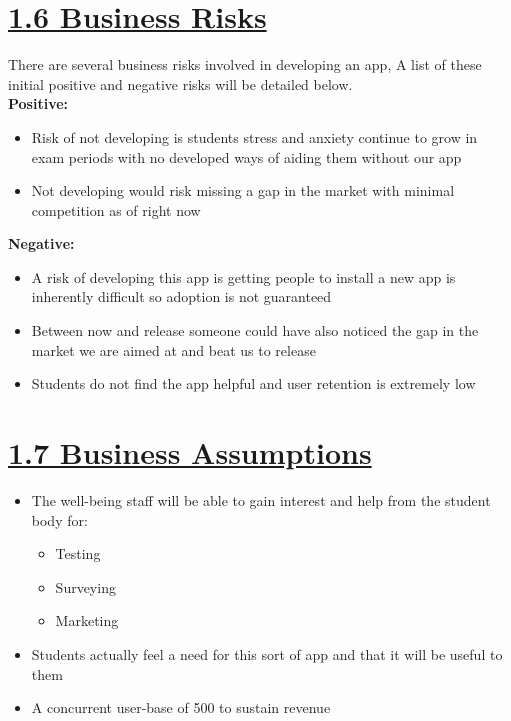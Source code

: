\documentclass[a4paper]{article}
\begin{document}
\section*{\underline{1.6 Business Risks}}
There are several business risks involved in developing an app, A list of these initial positive and negative risks will be detailed below.\\
\textbf{{\large Positive:}}
\begin{itemize}
	\item Risk of not developing is students stress and anxiety continue to grow in exam periods with no developed ways of aiding them without our app
	\item Not developing would risk missing a gap in the market with minimal competition as of right now
\end{itemize}
\textbf{{\large Negative:}}
\begin{itemize}
	\item A risk of developing this app is getting people to install a new app is inherently difficult so adoption is not guaranteed
	\item Between now and release someone could have also noticed the gap in the market we are aimed at and beat us to release
	\item Students do not find the app helpful and user retention is extremely low
\end{itemize}

\section*{\underline{1.7 Business Assumptions}}
\begin{itemize}
	\item The well-being staff will be able to gain interest and help from the student body for:
	\begin{itemize}
		\item Testing
		\item Surveying
		\item Marketing
	\end{itemize}
	\item Students actually feel a need for this sort of app and that it will be useful to them
	\item A concurrent user-base of 500 to sustain revenue
\end{itemize}
\pagebreak
\end{document}
